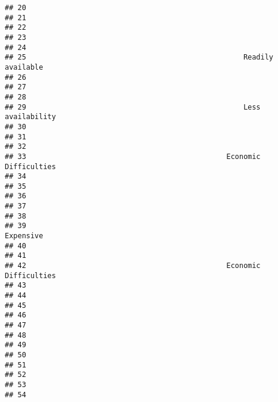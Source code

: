 \documentclass[
]{article}
\begin{document}
\begin{verbatim}
## 20                                                                     
## 21                                                                     
## 22                                                                     
## 23                                                                     
## 24                                                                     
## 25                                                   Readily available 
## 26                                                                     
## 27                                                                     
## 28                                                                     
## 29                                                   Less availability 
## 30                                                                     
## 31                                                                     
## 32                                                                     
## 33                                               Economic Difficulties 
## 34                                                                     
## 35                                                                     
## 36                                                                     
## 37                                                                     
## 38                                                                     
## 39                                                           Expensive 
## 40                                                                     
## 41                                                                     
## 42                                               Economic Difficulties 
## 43                                                                     
## 44                                                                     
## 45                                                                     
## 46                                                                     
## 47                                                                     
## 48                                                                     
## 49                                                                     
## 50                                                                     
## 51                                                                     
## 52                                                                     
## 53                                                                     
## 54                                                                     

\end{verbatim}
\end{document}
